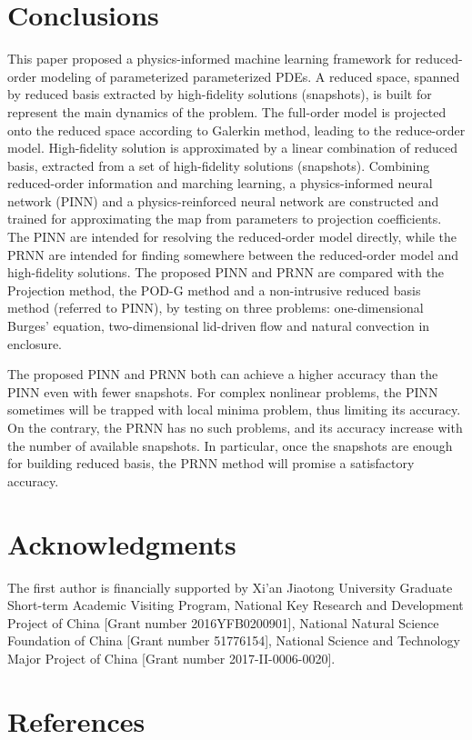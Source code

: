 \documentclass[preprint, 10pt]{elsarticle}
\begin{document}
\FloatBarrier
\section{Conclusions}
This paper proposed a physics-informed machine learning framework for reduced-order modeling of parameterized parameterized PDEs.
A reduced space, spanned by reduced basis extracted by high-fidelity solutions (snapshots), is built for represent the main dynamics of the problem. The full-order model is projected onto the reduced space according to Galerkin method, leading to the reduce-order model.
High-fidelity solution is approximated by a linear combination of reduced basis, extracted from a set of high-fidelity solutions (snapshots).
Combining reduced-order information and marching learning, a physics-informed neural network (PINN) and a physics-reinforced neural network are constructed and trained for approximating the map from parameters to projection coefficients.
The PINN are intended for resolving the reduced-order model directly, while the PRNN are intended for finding somewhere between the reduced-order model and high-fidelity solutions.  The proposed PINN and PRNN  are compared with the Projection method, the POD-G method and  a non-intrusive reduced basis method (referred to PINN), by testing on three problems: one-dimensional Burges' equation, two-dimensional lid-driven flow and natural convection in enclosure.

The proposed PINN and PRNN both can achieve a higher accuracy than the PINN even with fewer snapshots. For complex nonlinear problems, the PINN sometimes will be trapped with local minima problem, thus limiting its accuracy. On the contrary, the PRNN has no such problems, and its accuracy increase with the number of available snapshots. In particular, once the snapshots are enough for building reduced basis, the PRNN method will promise a satisfactory accuracy.


\section*{Acknowledgments}
The first author is financially supported by Xi'an Jiaotong University Graduate Short-term Academic Visiting Program, National Key Research and Development Project of China [Grant number 2016YFB0200901], National Natural Science Foundation of China [Grant number 51776154], National Science and Technology Major Project of China [Grant number 2017-II-0006-0020].

\section*{References}


\end{document}
